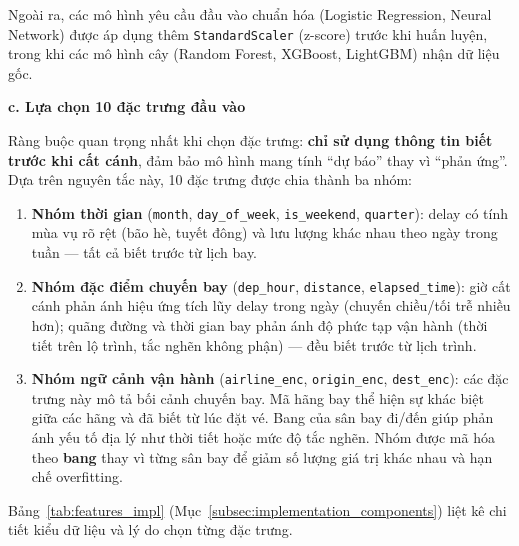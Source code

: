 Ngoài ra, các mô hình yêu cầu đầu vào chuẩn hóa (Logistic Regression, Neural Network)
được áp dụng thêm \texttt{StandardScaler} (z-score) trước khi huấn luyện,
trong khi các mô hình cây (Random Forest, XGBoost, LightGBM)
nhận dữ liệu gốc.

\noindent \textbf{c. Lựa chọn 10 đặc trưng đầu vào}

Ràng buộc quan trọng nhất khi chọn đặc trưng: \textbf{chỉ sử dụng thông tin biết
trước khi cất cánh}, đảm bảo mô hình mang tính ``dự báo'' thay vì ``phản ứng''.
Dựa trên nguyên tắc này, 10 đặc trưng được chia thành ba nhóm:

\begin{enumerate}
    \item \textbf{Nhóm thời gian} (\texttt{month}, \texttt{day\_of\_week},
          \texttt{is\_weekend}, \texttt{quarter}):
          delay có tính mùa vụ rõ rệt (bão hè, tuyết đông) và lưu lượng
          khác nhau theo ngày trong tuần --- tất cả biết trước từ lịch bay.

    \item \textbf{Nhóm đặc điểm chuyến bay} (\texttt{dep\_hour}, \texttt{distance},
          \texttt{elapsed\_time}):
          giờ cất cánh phản ánh hiệu ứng tích lũy delay trong ngày (chuyến chiều/tối trễ nhiều hơn);
          quãng đường và thời gian bay phản ánh độ phức tạp vận hành
          (thời tiết trên lộ trình, tắc nghẽn không phận) --- đều biết trước từ lịch trình.

    \item \textbf{Nhóm ngữ cảnh vận hành} (\texttt{airline\_enc}, \texttt{origin\_enc},
          \texttt{dest\_enc}): các đặc trưng này mô tả bối cảnh chuyến bay. Mã hãng bay thể hiện sự khác biệt giữa các hãng
      và đã biết từ lúc đặt vé. Bang của sân bay đi/đến giúp phản ánh yếu tố địa lý như thời tiết
      hoặc mức độ tắc nghẽn. Nhóm được mã hóa theo \textbf{bang} thay vì từng sân bay để giảm số
      lượng giá trị khác nhau và hạn chế overfitting.
\end{enumerate}

Bảng~\ref{tab:features_impl} (Mục~\ref{subsec:implementation_components})
liệt kê chi tiết kiểu dữ liệu và lý do chọn từng đặc trưng.

